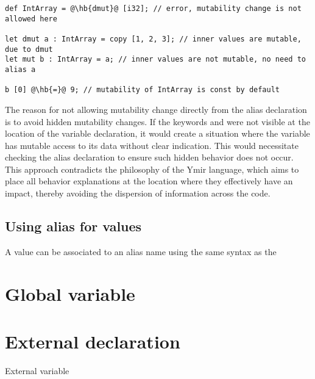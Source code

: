 \begin{lstlisting}[style=coloredverbatim, escapechar=@]
def IntArray = @\hb{dmut}@ [i32]; // error, mutability change is not allowed here

let dmut a : IntArray = copy [1, 2, 3]; // inner values are mutable, due to dmut
let mut b : IntArray = a; // inner values are not mutable, no need to alias a

b [0] @\hb{=}@ 9; // mutability of IntArray is const by default
\end{lstlisting}

The reason for not allowing mutability change directly from the alias
declaration is to avoid hidden mutability changes. If the keywords 
and  were not visible at the location of the variable declaration,
it would create a situation where the variable has mutable access to its data
without clear indication. This would necessitate checking the alias declaration
to ensure such hidden behavior does not occur. This approach contradicts the
philosophy of the Ymir language, which aims to place all behavior explanations
at the location where they effectively have an impact, thereby avoiding the
dispersion of information across the code.

\subsection{Using alias for values}

A value can be associated to an alias name using the same syntax as the

\section{Global variable}%
\label{sec:global_variables}

\section{External declaration}%
\label{sec:extern_var}

External variable
